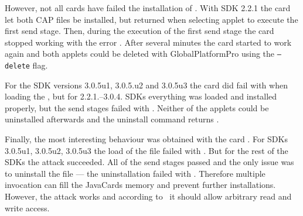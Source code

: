\documentclass{../llncs/llncs}
\begin{document}
            However, not all cards have failed the installation of \vulnscap. With SDK 2.2.1 the card \Dcard let both CAP files be installed, but returned \swclanotsupported when selecting applet to execute the first send stage. Then, during the execution of the first send stage the card stopped working with the error \scardenottransacted. After several minutes the card started to work again and both applets could be deleted with GlobalPlatformPro using the \texttt{--delete} flag.

            For the SDK versions 3.0.5u1, 3.0.5.u2 and 3.0.5u3 the card \Acard did fail with \swwrongdata when loading the \appletscap, but for 2.2.1.--3.0.4. SDKs everything was loaded and installed properly, but the send stages failed with \swunknown. Neither of the applets could be uninstalled afterwards and the uninstall command returns \swconditionsnotsatisfied.

            Finally, the most interesting behaviour was obtained with the card \Jcard. For SDKs 3.0.5u1, 3.0.5u2, 3.0.5u3 the load of the file \appletscap failed with \jerror. But for the rest of the SDKs the attack succeeded. All of the send stages passed and the only issue was to uninstall the \appletscap file --- the uninstallation failed with \swconditionsnotsatisfied. Therefore multiple invocation can fill the JavaCards memory and prevent further installations. However, the attack works and according to~\cite{se:oracle:part1} it should allow arbitrary read and write access.




\end{document}
